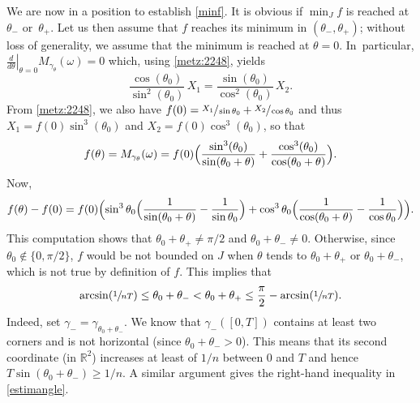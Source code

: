 \documentclass[10pt]{amsart}
\def\R{\mathbb{R}}
\theoremstyle{definition}
\begin{document}
We are now in a position to establish \eqref{minf}. It is obvious if $\min_J f$ is reached at ${\theta_-}$ or~$\theta_+$. Let us then assume that $f$ reaches its minimum {in $(\theta_-,\theta_+)$}; without loss of generality, we assume that the minimum is reached at $\theta=0$. In~particular, $\left.\frac{d}{d\theta}\right|_{\theta=0}M_{\gamma_\theta}(\omega)=0$
which, using \eqref{metz:2248}, yields
\[
\frac{\cos (\theta_0)}{\sin ^2(\theta_0)}\,X_1=\frac{\sin (\theta_0)}{\cos ^2(\theta_0)}\,X_2.
\]
From \eqref{metz:2248}, we also have $f(0)=\sfrac{X_1}{\sin \theta_0}+\sfrac{X_2}{\cos \theta_0}$ and thus
$X_1=f(0) \sin^3(\theta_0)$ and $X_2=f(0) \cos^3(\theta_0)$, so that
\[
f(\theta)= M_{\gamma_\theta}(\omega)= f(0) \Bigl( \frac{\sin^3(\theta_0)}{\sin(\theta_0+\theta)} + \frac{\cos^3(\theta_0)}{\cos(\theta_0+\theta)} \Bigr).
\]
Now,
\[
f(\theta)-f(0)=f(0) \Bigl(\sin^3\theta_0\Bigl(\frac{1}{\sin (\theta_0+\theta)}-\frac{1}{\sin \theta_0}\Bigr) +\cos^3\theta_0\Bigl(\frac{1}{\cos (\theta_0+\theta)}-\frac{1}{\cos \theta_0}\Bigr)\Bigr).
\]
This computation shows that $\theta_0 + \theta_+ \neq \pi/2$ {and} $\theta_0+\theta_-\neq 0$. Otherwise, since $\theta_0 \notin \{0, \pi/2\}$, $f$ would be not bounded on $J$ when $\theta$ tends to $\theta_0 + \theta_+$ or $\theta_0 + \theta_-$, which is not true by definition of $f$.
This implies that
\begin{equation} \label{estimangle}
\arcsin( \sfrac{1}{nT}) \leq \theta_0 + \theta_- < \theta_0 + \theta_+ \leq \frac{\pi}{2} -\arcsin( \sfrac{1}{nT}).
\end{equation}
Indeed, set $\gamma_- = \gamma_{\theta_0+\theta_-}$. We know that $\gamma_-([0,T])$ contains at least two corners and is not horizontal (since $\theta_0+\theta_->0$). This means that its second coordinate (in $\R^2$) increases at least of $1/n$ between $0$ and $T$ and hence $T \sin(\theta_0 + \theta_-) \geq 1/n$. A similar argument gives the right-hand inequality in \eqref{estimangle}.
\end{document}
